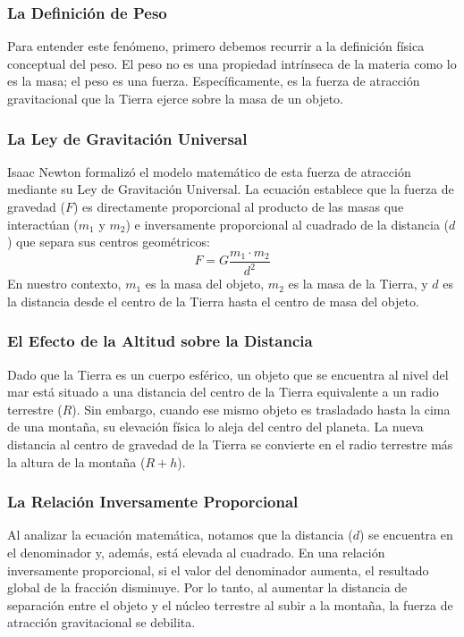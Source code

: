 \documentclass[12pt]{article}
\begin{document}
\subsubsection*{La Definición de Peso}
Para entender este fenómeno, primero debemos recurrir a la definición física conceptual del peso. El peso no es una propiedad intrínseca de la materia como lo es la masa; el peso es una fuerza. Específicamente, es la fuerza de atracción gravitacional que la Tierra ejerce sobre la masa de un objeto. 

\subsubsection*{La Ley de Gravitación Universal}
Isaac Newton formalizó el modelo matemático de esta fuerza de atracción mediante su Ley de Gravitación Universal. La ecuación establece que la fuerza de gravedad ($F$) es directamente proporcional al producto de las masas que interactúan ($m_1$ y $m_2$) e inversamente proporcional al cuadrado de la distancia ($d$) que separa sus centros geométricos:
\begin{equation}
    F = G \frac{m_1 \cdot m_2}{d^2}
\end{equation}
En nuestro contexto, $m_1$ es la masa del objeto, $m_2$ es la masa de la Tierra, y $d$ es la distancia desde el centro de la Tierra hasta el centro de masa del objeto.

\subsubsection*{El Efecto de la Altitud sobre la Distancia}
Dado que la Tierra es un cuerpo esférico, un objeto que se encuentra al nivel del mar está situado a una distancia del centro de la Tierra equivalente a un radio terrestre ($R$). Sin embargo, cuando ese mismo objeto es trasladado hasta la cima de una montaña, su elevación física lo aleja del centro del planeta. La nueva distancia al centro de gravedad de la Tierra se convierte en el radio terrestre más la altura de la montaña ($R + h$). 

\subsubsection*{La Relación Inversamente Proporcional}
Al analizar la ecuación matemática, notamos que la distancia ($d$) se encuentra en el denominador y, además, está elevada al cuadrado. En una relación inversamente proporcional, si el valor del denominador aumenta, el resultado global de la fracción disminuye. Por lo tanto, al aumentar la distancia de separación entre el objeto y el núcleo terrestre al subir a la montaña, la fuerza de atracción gravitacional se debilita. 
\end{document}
